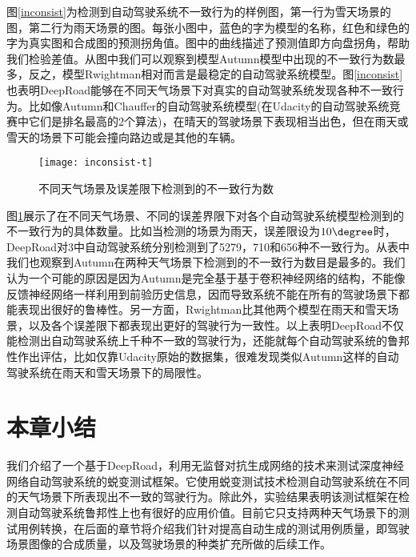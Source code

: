图\ref{inconsist}为检测到自动驾驶系统不一致行为的样例图，第一行为雪天场景的图，第二行为雨天场景的图。每张小图中，蓝色的字为模型的名称，红色和绿色的字为真实图和合成图的预测拐角值。图中的曲线描述了预测值即方向盘拐角，帮助我们检验差值。从图中我们可以观察到模型Autumn模型中出现的不一致行为数最多，反之，模型Rwightman相对而言是最稳定的自动驾驶系统模型。图\ref{inconsist}也表明DeepRoad能够在不同天气场景下对真实的自动驾驶系统发现各种不一致行为。比如像Autumn和Chauffer的自动驾驶系统模型(在Udacity的自动驾驶系统竞赛中它们是排名最高的2个算法)，在晴天的驾驶场景下表现相当出色，但在雨天或雪天的场景下可能会撞向路边或是其他的车辆。

\begin{figure}[]
    \centering
    \texttt{[image: inconsist-t]}
    \caption{不同天气场景及误差限下检测到的不一致行为数}
    \label{inconsist-t}
\end{figure}

图\ref{inconsist-t}展示了在不同天气场景、不同的误差界限下对各个自动驾驶系统模型检测到的不一致行为的具体数量。比如当检测的场景为雨天，误差限设为$10\degree$时，DeepRoad对3中自动驾驶系统分别检测到了5279，710和656种不一致行为。从表中我们也观察到Autumn在两种天气场景下检测到的不一致行为数目是最多的。我们认为一个可能的原因是因为Autumn是完全基于基于卷积神经网络的结构，不能像反馈神经网络一样利用到前验历史信息，因而导致系统不能在所有的驾驶场景下都能表现出很好的鲁棒性。另一方面，Rwightman比其他两个模型在雨天和雪天场景，以及各个误差限下都表现出更好的驾驶行为一致性。以上表明DeepRoad不仅能检测出自动驾驶系统上千种不一致的驾驶行为，还能就每个自动驾驶系统的鲁邦性作出评估，比如仅靠Udacity原始的数据集，很难发现类似Autumn这样的自动驾驶系统在雨天和雪天场景下的局限性。

\section{本章小结}

我们介绍了一个基于DeepRoad\cite{DeepRoad}，利用无监督对抗生成网络的技术来测试深度神经网络自动驾驶系统的蜕变测试框架。它使用蜕变测试技术检测自动驾驶系统在不同的天气场景下所表现出不一致的驾驶行为。除此外，实验结果表明该测试框架在检测自动驾驶系统鲁邦性上也有很好的应用价值。目前它只支持两种天气场景下的测试用例转换，在后面的章节将介绍我们针对提高自动生成的测试用例质量，即驾驶场景图像的合成质量，以及驾驶场景的种类扩充所做的后续工作。